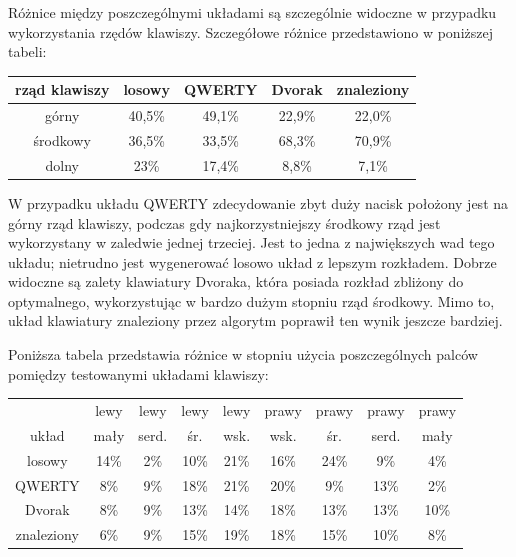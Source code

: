 \documentclass[brudnopis]{xmgr}
\begin{document}
Różnice między poszczególnymi układami są szczególnie widoczne w przypadku wykorzystania rzędów klawiszy. Szczegółowe różnice przedstawiono w poniższej tabeli:\newline\newline
\begin{tabular}{ c | c | c | c | c}
  rząd klawiszy   & losowy & QWERTY & Dvorak & znaleziony \\
  \hline
  górny           & 40,5\% & 49,1\% & 22,9\% & 22,0\% \\
  środkowy        & 36,5\% & 33,5\% & 68,3\% & 70,9\% \\
  dolny           &   23\% & 17,4\% &  8,8\% &  7,1\% \\
\end{tabular}\newline

W przypadku układu QWERTY zdecydowanie zbyt duży nacisk położony jest na górny rząd klawiszy, podczas gdy najkorzystniejszy środkowy rząd jest wykorzystany w zaledwie jednej trzeciej. Jest to jedna z największych wad tego układu; nietrudno jest wygenerować losowo układ z lepszym rozkładem. Dobrze widoczne są zalety klawiatury Dvoraka, która posiada rozkład zbliżony do optymalnego, wykorzystując w bardzo dużym stopniu rząd środkowy. Mimo to, układ klawiatury znaleziony przez algorytm poprawił ten wynik jeszcze bardziej.

Poniższa tabela przedstawia różnice w stopniu użycia poszczególnych palców pomiędzy testowanymi układami klawiszy:\newline\newline
\begin{tabular}{ c | c | c | c | c | c | c | c | c}
                & lewy & lewy      & lewy     & lewy       & prawy      & prawy    & prawy     & prawy \\
  układ         & mały & serd. & śr. & wsk. & wsk. & śr. & serd. & mały \\
  \hline
  losowy        & 14\% & 2\% & 10\% & 21\% & 16\% & 24\% & 9\%  & 4\% \\
  QWERTY        &  8\% & 9\% & 18\% & 21\% & 20\% & 9\%  & 13\% & 2\% \\
  Dvorak        &  8\% & 9\% & 13\% & 14\% & 18\% & 13\% & 13\% & 10\% \\
  znaleziony    &  6\% & 9\% & 15\% & 19\% & 18\% & 15\% & 10\% & 8\% \\
\end{tabular}\newline
\end{document}
